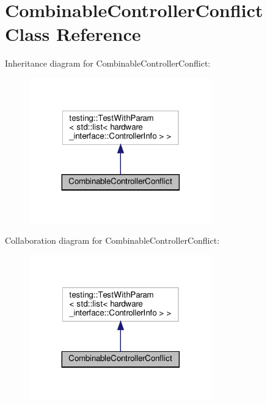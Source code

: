 \hypertarget{class_combinable_controller_conflict}{}\section{Combinable\+Controller\+Conflict Class Reference}
\label{class_combinable_controller_conflict}


Inheritance diagram for Combinable\+Controller\+Conflict\+:
\nopagebreak
\begin{figure}[H]
\begin{center}
\leavevmode
\includegraphics[width=224pt]{class_combinable_controller_conflict__inherit__graph}
\end{center}
\end{figure}


Collaboration diagram for Combinable\+Controller\+Conflict\+:
\nopagebreak
\begin{figure}[H]
\begin{center}
\leavevmode
\includegraphics[width=224pt]{class_combinable_controller_conflict__coll__graph}
\end{center}
\end{figure}
